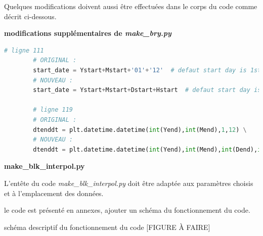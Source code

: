 \documentclass[10pt,a4paper,titlepage]{article}
\begin{document}
Quelques modifications doivent aussi être effectuées dans le corps du code comme décrit ci-dessous.

\begin{codeEnv}{\textbf{modifications supplémentaires de \textit{make\_bry.py}}}
    \begin{lstlisting}[language=python]
        # ligne 111
        # ORIGINAL :
        start_date = Ystart+Mstart+'01'+'12'  # defaut start day is 1st
        # NOUVEAU :
        start_date = Ystart+Mstart+Dstart+Hstart  # defaut start day is 1st

        # ligne 119
        # ORIGINAL :
        dtenddt = plt.datetime.datetime(int(Yend),int(Mend),1,12) \
        # NOUVEAU :
        dtenddt = plt.datetime.datetime(int(Yend),int(Mend),int(Dend),int(Hend)) \
    \end{lstlisting}
\end{codeEnv}


\textbf{make\_blk\_interpol.py}

L'entête du code \textit{make\_blk\_interpol.py} doit être adaptée aux paramètres choisis et à l'emplacement des données.

le code est présenté en annexes, ajouter un schéma du fonctionnement du code.

schéma descriptif du fonctionnement du code [FIGURE À FAIRE]
\end{document}
